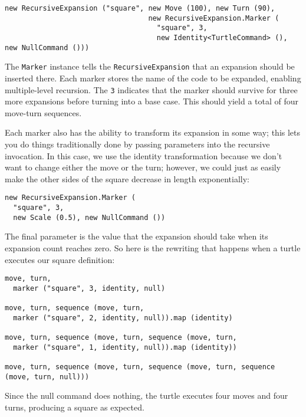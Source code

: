 \documentclass{report}
\begin{document}
\begin{verbatim}
new RecursiveExpansion ("square", new Move (100), new Turn (90),
                                  new RecursiveExpansion.Marker (
                                    "square", 3,
                                    new Identity<TurtleCommand> (), new NullCommand ()))
\end{verbatim}

      The {\tt Marker} instance tells the {\tt RecursiveExpansion} that an expansion should be inserted there. Each marker stores the name of the code to be
      expanded, enabling multiple-level recursion. The \verb|3| indicates that the marker should survive for three more expansions before turning into a base
      case. This should yield a total of four move-turn sequences.

      Each marker also has the ability to transform its expansion in some way; this lets you do things traditionally done by passing parameters into the
      recursive invocation. In this case, we use the identity transformation because we don't want to change either the move or the turn; however, we could just
      as easily make the other sides of the square decrease in length exponentially:

\begin{verbatim}
new RecursiveExpansion.Marker (
  "square", 3,
  new Scale (0.5), new NullCommand ())
\end{verbatim}

      The final parameter is the value that the expansion should take when its expansion count reaches zero. So here is the rewriting that happens when a turtle
      executes our square definition:

\begin{verbatim}
move, turn,
  marker ("square", 3, identity, null)

move, turn, sequence (move, turn,
  marker ("square", 2, identity, null)).map (identity)

move, turn, sequence (move, turn, sequence (move, turn,
  marker ("square", 1, identity, null)).map (identity))

move, turn, sequence (move, turn, sequence (move, turn, sequence (move, turn, null)))
\end{verbatim}

      Since the null command does nothing, the turtle executes four moves and four turns, producing a square as expected.
\end{document}
